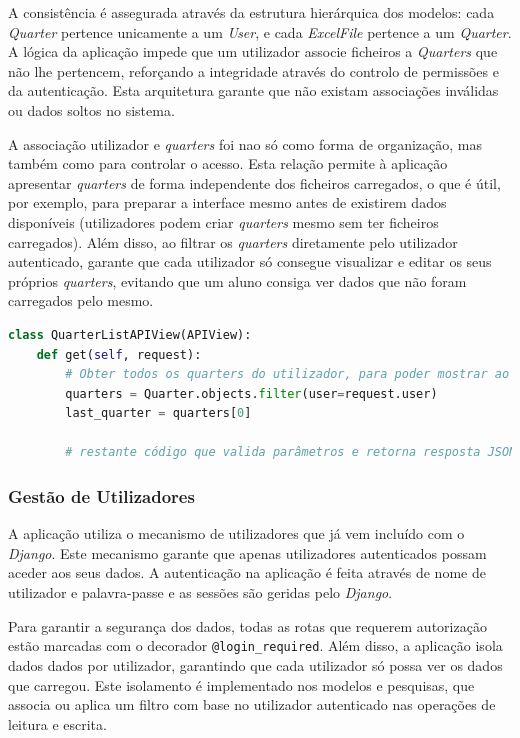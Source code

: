 A consistência é assegurada através da estrutura hierárquica dos modelos: cada \textit{Quarter} pertence unicamente a um \textit{User}, e cada \textit{ExcelFile} pertence a um \textit{Quarter}. A lógica da aplicação impede que um utilizador associe ficheiros a \textit{Quarters} que não lhe pertencem, reforçando a integridade através do controlo de permissões e da autenticação. Esta arquitetura garante que não existam associações inválidas ou dados soltos no sistema.  

A associação utilizador e \textit{quarters} foi nao só como forma de organização, mas também como para controlar o acesso. Esta relação permite à aplicação apresentar \textit{quarters} de forma independente dos ficheiros carregados, o que é útil, por exemplo, para preparar a interface mesmo antes de existirem dados disponíveis (utilizadores podem criar \textit{quarters} mesmo sem ter ficheiros carregados). Além disso, ao filtrar os \textit{quarters} diretamente pelo utilizador autenticado, garante que cada utilizador só consegue visualizar e editar os seus próprios \textit{quarters}, evitando que um aluno consiga ver dados que não foram carregados pelo mesmo.

\begin{lstlisting}[language=Python, caption={Excerto do código \textit{Python} do \textit{endpoint} para listagem de \textit{quarters} }]
class QuarterListAPIView(APIView):
    def get(self, request):
        # Obter todos os quarters do utilizador, para poder mostrar ao utilizador os quarters para onde pode carregar ficheiros
        quarters = Quarter.objects.filter(user=request.user)
        last_quarter = quarters[0]
       
        # restante código que valida parâmetros e retorna resposta JSON com os dados do quarter
\end{lstlisting}


\subsubsection{Gestão de Utilizadores}

A aplicação utiliza o mecanismo de utilizadores que já vem incluído com o \textit{Django}. Este mecanismo garante que apenas utilizadores autenticados possam aceder aos seus dados. A autenticação na aplicação é feita através de nome de utilizador e palavra-passe e as sessões são geridas pelo \textit{Django}.

Para garantir a segurança dos dados, todas as rotas que requerem autorização estão marcadas com o decorador \texttt{@login\_required}. Além disso, a aplicação isola dados dados por utilizador, garantindo que cada utilizador só possa ver os dados que carregou. Este isolamento é implementado nos modelos e pesquisas, que associa ou aplica um filtro com base no utilizador autenticado nas operações de leitura e escrita.

